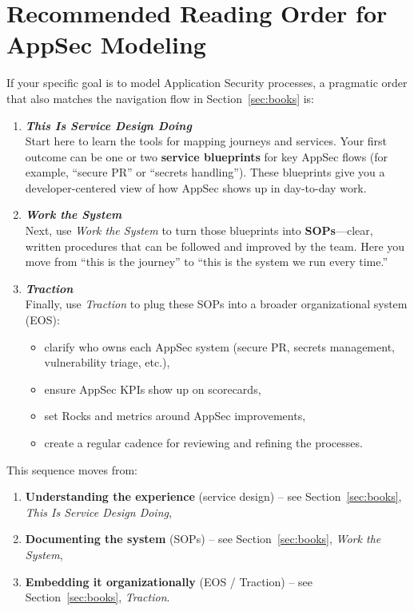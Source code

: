 \documentclass[11pt]{article}
\begin{document}
\clearpage
\section{Recommended Reading Order for AppSec Modeling}
\label{sec:reading-order}

If your specific goal is to model Application Security processes,
a pragmatic order that also matches the navigation flow in
Section~\ref{sec:books} is:

\begin{enumerate}
  \item \textbf{\emph{This Is Service Design Doing}}\\
        Start here to learn the tools for mapping journeys and services.
        Your first outcome can be one or two \textbf{service blueprints}
        for key AppSec flows (for example, ``secure PR'' or
        ``secrets handling''). These blueprints give you a developer-centered
        view of how AppSec shows up in day-to-day work.
  \item \textbf{\emph{Work the System}}\\
        Next, use \emph{Work the System} to turn those blueprints into
        \textbf{SOPs}---clear, written procedures that can be followed
        and improved by the team. Here you move from ``this is the journey''
        to ``this is the system we run every time.''
  \item \textbf{\emph{Traction}}\\
        Finally, use \emph{Traction} to plug these SOPs into a broader
        organizational system (EOS):
        \begin{itemize}
          \item clarify who owns each AppSec system (secure PR,
                secrets management, vulnerability triage, etc.),
          \item ensure AppSec KPIs show up on scorecards,
          \item set Rocks and metrics around AppSec improvements,
          \item create a regular cadence for reviewing and refining
                the processes.
        \end{itemize}
\end{enumerate}

This sequence moves from:
\begin{enumerate}
  \item \textbf{Understanding the experience} (service design) --
        see Section~\ref{sec:books}, \emph{This Is Service Design Doing},
  \item \textbf{Documenting the system} (SOPs) --
        see Section~\ref{sec:books}, \emph{Work the System},
  \item \textbf{Embedding it organizationally} (EOS / Traction) --
        see Section~\ref{sec:books}, \emph{Traction}.
\end{enumerate}
\end{document}
